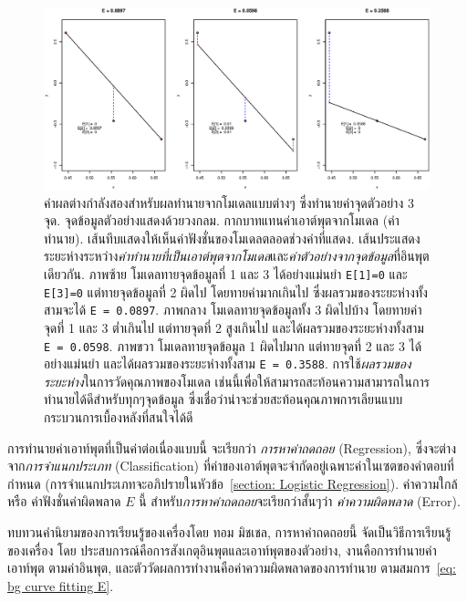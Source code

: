 %
\begin{figure}
\begin{center}
\includegraphics[width=5.5in]{02Background/bgMSE.eps}
\end{center}
\caption{ค่าผลต่างกำลังสองสำหรับผลทำนายจากโมเดลแบบต่างๆ ซึ่งทำนายค่าจุดตัวอย่าง $3$ จุด.
จุดข้อมูลตัวอย่างแสดงด้วยวงกลม.
กากบาทแทนค่าเอาต์พุตจากโมเดล (ค่าทำนาย).
เส้นทึบแสดงให้เห็นค่าฟังชั่นของโมเดลตลอดช่วงค่าที่แสดง.
เส้นประแสดงระยะห่างระหว่าง\textit{ค่าทำนายที่เป็นเอาต์พุตจากโมเดล}และ\textit{ค่าตัวอย่างจากจุดข้อมูล}ที่อินพุตเดียวกัน.
ภาพซ้าย โมเดลทายจุดข้อมูลที่ 1 และ 3 ได้อย่างแม่นยำ \texttt{E[1]=0} และ \texttt{E[3]=0}
แต่ทายจุดข้อมูลที่ 2 ผิดไป โดยทายค่ามากเกินไป ซึ่งผลรวมของระยะห่างทั้งสามจะได้ \texttt{E = 0.0897}.
ภาพกลาง โมเดลทายจุดข้อมูลทั้ง $3$ ผิดไปบ้าง โดยทายค่าจุดที่ 1 และ 3 ต่ำเกินไป แต่ทายจุดที่ 2 สูงเกินไป
และได้ผลรวมของระยะห่างทั้งสาม \texttt{E = 0.0598}.
ภาพขวา โมเดลทายจุดข้อมูล 1 ผิดไปมาก แต่ทายจุดที่ 2 และ 3 ได้อย่างแม่นยำ
และได้ผลรวมของระยะห่างทั้งสาม \texttt{E = 0.3588}.
การใช้\textit{ผลรวมของระยะห่าง}ในการวัดคุณภาพของโมเดล เช่นนี้เพื่อให้สามารถสะท้อนความสามารถในการทำนายได้ดีสำหรับทุกๆจุดข้อมูล
ซึ่งเชื่อว่าน่าจะช่วยสะท้อนคุณภาพการเลียนแบบกระบวนการเบื้องหลังที่สนใจได้ดี}
\label{fig: bg MSE}
\end{figure}
%

การทำนายค่าเอาท์พุตที่เป็นค่าต่อเนื่องแบบนี้ จะเรียกว่า \textit{การหาค่าถดถอย} (Regression), ซึ่งจะต่างจาก\textit{การจำแนกประเภท} (Classification) ที่ค่าของเอาต์พุตจะจำกัดอยู่เฉพาะค่าในเซตของคำตอบที่กำหนด 
(การจำแนกประเภทจะอภิปรายในหัวข้อ~\ref{section: Logistic Regression}).
ค่าความใกล้ หรือ ค่าฟังชั่นค่าผิดพลาด $E$ นี้ สำหรับ\textit{การหาค่าถดถอย}จะเรียกว่าสั้นๆว่า \textit{ค่าความผิดพลาด} (Error).

ทบทวนคำนิยามของการเรียนรู้ของเครื่องโดย ทอม มิชเชล\cite{Mitchell1997a}, การหาค่าถดถอยนี้ จัดเป็นวิธีการเรียนรู้ของเครื่อง โดย ประสบการณ์คือการสังเกตุอินพุตและเอาท์พุตของตัวอย่าง, 
งานคือการทำนายค่าเอาท์พุต ตามค่าอินพุต, 
และตัววัดผลการทำงานคือค่าความผิดพลาดของการทำนาย ตามสมการ~\ref{eq: bg curve fitting E}.

